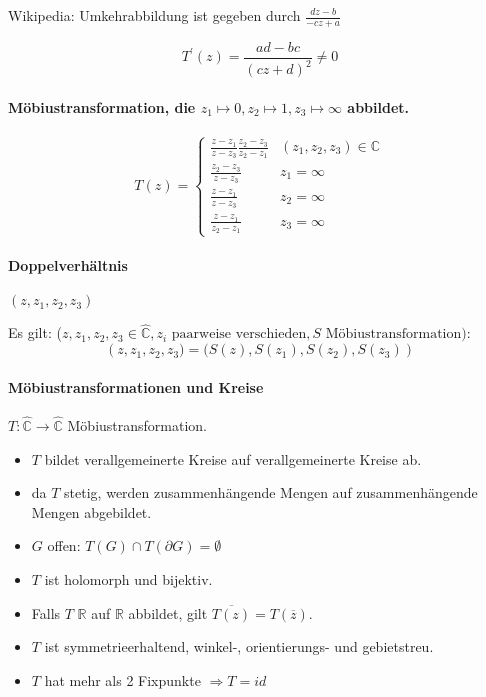 \documentclass[a4paper, 10pt, DIV20, headings=small]{scrartcl}
\theoremstyle{definition}
\theoremstyle{plain}
\begin{document}
Wikipedia: Umkehrabbildung ist gegeben durch $\frac{dz-b}{-cz+a}$

$$T^\prime(z) = \frac{ad-bc}{(cz+d)^2} \neq 0$$

\paragraph{Möbiustransformation, die $z_1 \mapsto 0, z_2 \mapsto 1, z_3 \mapsto \infty $ abbildet.}
$$T(z) = \begin{cases} \frac{z-z_1}{z-z_3} \frac{z_2-z_3}{z_2-z_1} & (z_1,z_2,z_3) \in \mathbb{C} \\
\frac{z_2-z_3}{z-z_3} & z_1 = \infty \\
\frac{z-z_1}{z-z_3} & z_2 = \infty \\
\frac{z-z_1}{z_2-z_1} & z_3 = \infty \end{cases}$$

\paragraph{Doppelverhältnis} $(z,z_1,z_2,z_3)$

Es gilt: ($z,z_1,z_2,z_3 \in \widehat{\mathbb{C}}, z_i \text{ paarweise verschieden}, S \text{ Möbiustransformation}):$ 
$$\left(z, z_1 , z_2 , z_3 ) = (S(z), S(z_1 ), S(z_2 ), S(z_3 )\right)$$


\paragraph{Möbiustransformationen und Kreise}
$T \colon \widehat{\mathbb{C}} \rightarrow \widehat{\mathbb{C}}$ Möbiustransformation.
\begin{itemize}
	\item $T$ bildet verallgemeinerte Kreise auf verallgemeinerte Kreise ab.
	\item da $T$ stetig, werden zusammenhängende Mengen auf zusammenhängende Mengen abgebildet.
	\item $G$ offen: $T(G) \cap T(\partial G) = \emptyset$
	\item $T$ ist holomorph und bijektiv.
	\item Falls $T$ $\mathbb{R}$ auf $\mathbb{R}$ abbildet, gilt $\overline{T(z)} = T(\overline{z})$.
	\item $T$ ist symmetrieerhaltend, winkel-, orientierungs- und gebietstreu.
	\item $T$ hat mehr als 2 Fixpunkte $\Rightarrow T = id$
\end{itemize}
\end{document}
